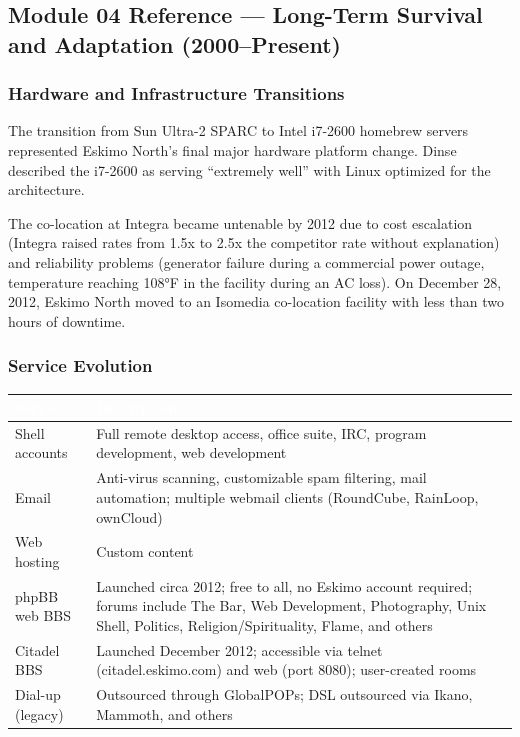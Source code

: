 \documentclass[11pt,letterpaper]{article}
\newcommand{\tableheader}[1]{\textbf{\sffamily\textcolor{white}{#1}}}
\begin{document}
\subsection{Module 04 Reference --- Long-Term Survival and Adaptation (2000--Present)}

\subsubsection{Hardware and Infrastructure Transitions}

The transition from Sun Ultra-2 SPARC to Intel i7-2600 homebrew servers represented Eskimo North's final major hardware platform change. Dinse described the i7-2600 as serving ``extremely well'' with Linux optimized for the architecture.

The co-location at Integra became untenable by 2012 due to cost escalation (Integra raised rates from 1.5x to 2.5x the competitor rate without explanation) and reliability problems (generator failure during a commercial power outage, temperature reaching 108°F in the facility during an AC loss). On December 28, 2012, Eskimo North moved to an Isomedia co-location facility with less than two hours of downtime.

\subsubsection{Service Evolution}

\begin{center}
\begin{tabularx}{\textwidth}{L{3cm}X}
\toprule
{}
\tableheader{Service} & \tableheader{Description} \\
\midrule
Shell accounts & Full remote desktop access, office suite, IRC, program development, web development \\
Email & Anti-virus scanning, customizable spam filtering, mail automation; multiple webmail clients (RoundCube, RainLoop, ownCloud) \\
Web hosting & Custom content \\
phpBB web BBS & Launched circa 2012; free to all, no Eskimo account required; forums include The Bar, Web Development, Photography, Unix Shell, Politics, Religion/Spirituality, Flame, and others \\
Citadel BBS & Launched December 2012; accessible via telnet (citadel.eskimo.com) and web (port 8080); user-created rooms \\
Dial-up (legacy) & Outsourced through GlobalPOPs; DSL outsourced via Ikano, Mammoth, and others \\
\bottomrule
\end{tabularx}
\end{center}
\end{document}
